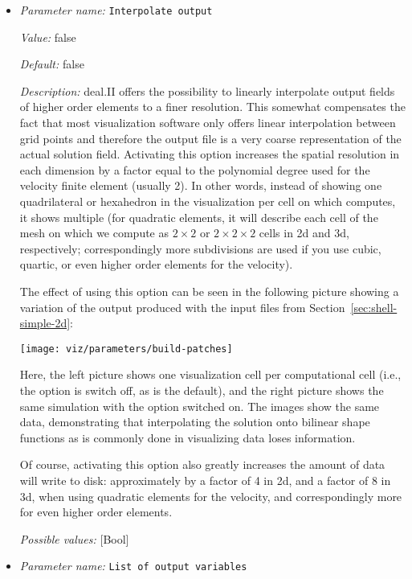\begin{itemize}
\item {\it Parameter name:} {\tt Interpolate output}
\label{parameters:Postprocess/Visualization/Interpolate output}


{\it Value:} false


{\it Default:} false


{\it Description:} deal.II offers the possibility to linearly interpolate output fields of higher order elements to a finer resolution. This somewhat compensates the fact that most visualization software only offers linear interpolation between grid points and therefore the output file is a very coarse representation of the actual solution field. Activating this option increases the spatial resolution in each dimension by a factor equal to the polynomial degree used for the velocity finite element (usually 2). In other words, instead of showing one quadrilateral or hexahedron in the visualization per cell on which \aspect{} computes, it shows multiple (for quadratic elements, it will describe each cell of the mesh on which we compute as $2\times 2$ or $2\times 2\times 2$ cells in 2d and 3d, respectively; correspondingly more subdivisions are used if you use cubic, quartic, or even higher order elements for the velocity).

The effect of using this option can be seen in the following picture showing a variation of the output produced with the input files from Section~\ref{sec:shell-simple-2d}:

\begin{center}  \texttt{[image: viz/parameters/build-patches]}\end{center}Here, the left picture shows one visualization cell per computational cell (i.e., the option is switch off, as is the default), and the right picture shows the same simulation with the option switched on. The images show the same data, demonstrating that interpolating the solution onto bilinear shape functions as is commonly done in visualizing data loses information.

Of course, activating this option also greatly increases the amount of data \aspect{} will write to disk: approximately by a factor of 4 in 2d, and a factor of 8 in 3d, when using quadratic elements for the velocity, and correspondingly more for even higher order elements.


{\it Possible values:} [Bool]
\item {\it Parameter name:} {\tt List of output variables}
\label{parameters:Postprocess/Visualization/List of output variables}



\end{itemize}
